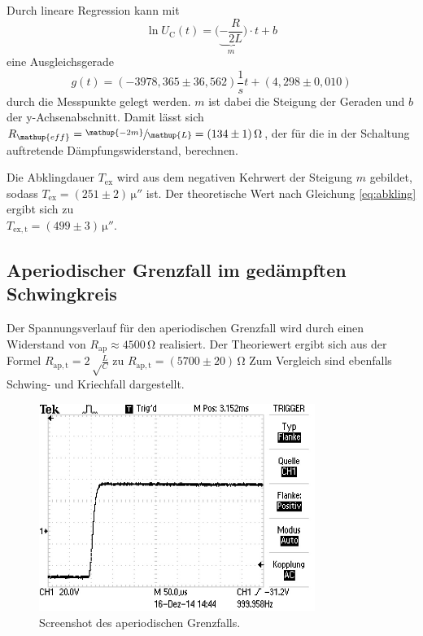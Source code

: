 Durch lineare Regression kann mit
\begin{equation}
\ln{U_\mathup{C}}(t)=\bigl(\underbrace{-\frac{R}{2L}}_m\bigr)\cdot t +b
\end{equation}
eine Ausgleichsgerade 
\begin{equation}
g(t)=(-3978,365\pm 36,562)\frac{1}{s} t + (4,298\pm0,010)
\end{equation}
durch die Messpunkte gelegt werden. 
$m$ ist dabei die Steigung der Geraden und $b$ der y-Achsenabschnitt.
Damit lässt sich $R_\mathup{eff}=\sfrac{\mathup{-2m}}{\mathup{L}}=(134\pm1)\,\si\ohm$, der für die in der Schaltung auftretende Dämpfungswiderstand, berechnen. 

Die Abklingdauer $T_\mathup{ex}$ wird aus dem negativen Kehrwert der Steigung $m$ gebildet, sodass $T_\mathup{ex}=(251\pm2)\,\si{\micro{\second}}$ ist.
Der theoretische Wert nach Gleichung \eqref{eq:abkling} ergibt sich zu \\$T_\mathup{ex,t}=(499\pm3)\,\si{\micro{\second}}$.


\subsection{Aperiodischer Grenzfall im gedämpften Schwingkreis}
Der Spannungsverlauf für den aperiodischen Grenzfall wird durch einen Widerstand von $R_\mathup{ap}\approx4500\,\si\ohm$ realisiert. 
Der Theoriewert ergibt sich aus der Formel $R_\mathup{ap,t}=2\sqrt\frac{L}{C}$ zu $R_\mathup{ap,t}=(5700\pm20)\,\si\ohm$
 Zum Vergleich sind ebenfalls Schwing- und Kriechfall dargestellt.
\newpage
\begin{figure}[h]
		\centering
		\includegraphics[width=0.8\textwidth]{Bilder/Aperiodischer.JPG}
		\caption{Screenshot des aperiodischen Grenzfalls.}
\end{figure}

